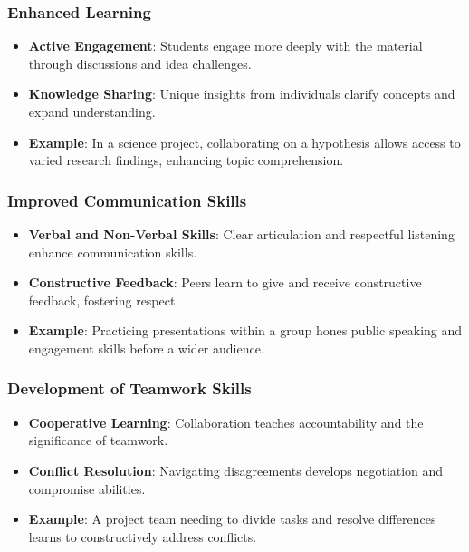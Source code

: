 \documentclass{beamer}
\begin{document}
\begin{frame}[fragile]
    \frametitle{Enhanced Learning}
    \begin{itemize}
        \item \textbf{Active Engagement}: 
        Students engage more deeply with the material through discussions and idea challenges.
        
        \item \textbf{Knowledge Sharing}: 
        Unique insights from individuals clarify concepts and expand understanding.
        
        \item \textbf{Example}: 
        In a science project, collaborating on a hypothesis allows access to varied research findings, enhancing topic comprehension.
    \end{itemize}
\end{frame}

\begin{frame}[fragile]
    \frametitle{Improved Communication Skills}
    \begin{itemize}
        \item \textbf{Verbal and Non-Verbal Skills}: 
        Clear articulation and respectful listening enhance communication skills.
        
        \item \textbf{Constructive Feedback}: 
        Peers learn to give and receive constructive feedback, fostering respect.
        
        \item \textbf{Example}: 
        Practicing presentations within a group hones public speaking and engagement skills before a wider audience.
    \end{itemize}
\end{frame}

\begin{frame}[fragile]
    \frametitle{Development of Teamwork Skills}
    \begin{itemize}
        \item \textbf{Cooperative Learning}: 
        Collaboration teaches accountability and the significance of teamwork.
        
        \item \textbf{Conflict Resolution}: 
        Navigating disagreements develops negotiation and compromise abilities.
        
        \item \textbf{Example}: 
        A project team needing to divide tasks and resolve differences learns to constructively address conflicts.
    \end{itemize}
\end{frame}
\end{document}
